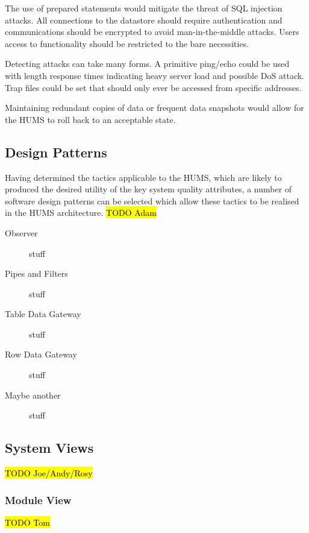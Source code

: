 \documentclass[10pt,a4paper]{article}
\begin{document}
\begin{description}
\begin{description}[noitemsep]
	\end{description}
\item[Security] \hfill
	\begin{description}[noitemsep]
	\item[Resisting Attacks] The use of prepared statements would mitigate the threat of SQL injection attacks. All connections to the datastore should require authentication and communications should be encrypted to avoid man-in-the-middle attacks. Users access to functionality should be restricted to the bare necessities. 
	\item[Detecting Attacks] Detecting attacks can take many forms. A primitive ping/echo could be used with length response times indicating heavy server load and possible DoS attack. Trap files could be set that should only ever be accessed from specific addresses.
	\item[Recovering From Attacks] Maintaining redundant copies of data or frequent data snapshots would allow for the HUMS to roll back to an acceptable state.
	\end{description}
\end{description}

\subsection{Design Patterns}
Having determined the tactics applicable to the HUMS, which are likely to produced the desired utility of the key system quality attributes, a number of software design patterns can be selected which allow these tactics to be realised in the HUMS architecture.
\hl{TODO Adam}
\begin{description}
\item[Observer] stuff
\item[Pipes and Filters] stuff
\item[Table Data Gateway] stuff
\item[Row Data Gateway] stuff
\item[Maybe another] stuff
\end{description}

\subsection{System Views} 
\hl{TODO Joe/Andy/Rosy}

\subsubsection{Module View}
\label{sec:views}
\hl{TODO Tom}
\end{document}
